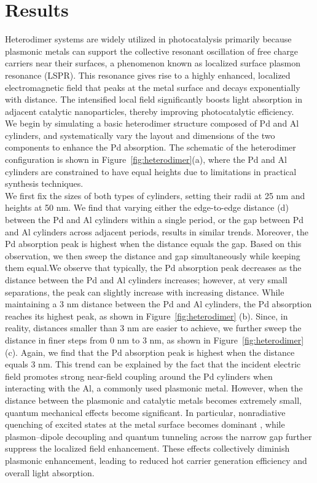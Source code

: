 \documentclass[journal]{IEEEtran}
\begin{document}
\section{Results}
\indent
Heterodimer systems are widely utilized in photocatalysis primarily because plasmonic metals can support the collective resonant oscillation of free charge carriers near their surfaces, a phenomenon known as localized surface plasmon resonance (LSPR). This resonance gives rise to a highly enhanced, localized electromagnetic field that peaks at the metal surface and decays exponentially with distance. The intensified local field significantly boosts light absorption in adjacent catalytic nanoparticles, thereby improving photocatalytic efficiency.\\
\indent
We begin by simulating a basic heterodimer structure composed of Pd and Al cylinders, and systematically vary the layout and dimensions of the two components to enhance the Pd absorption. The schematic of the heterodimer configuration is shown in Figure~\ref{fig:heterodimer}(a), where the Pd and Al cylinders are constrained to have equal heights due to limitations in practical synthesis techniques.\cite{doi:10.1021/acs.nanolett.6b03582}\\
\indent
We first fix the sizes of both types of cylinders, setting their radii at 25 nm and heights at 50 nm. We find that varying either the edge-to-edge distance (d) between the Pd and Al cylinders within a single period, or the gap between Pd and Al cylinders across adjacent periods, results in similar trends. Moreover, the Pd absorption peak is highest when the distance equals the gap. Based on this observation, we then sweep the distance and gap simultaneously while keeping them equal.We observe that typically, the Pd absorption peak decreases as the distance between the Pd and Al cylinders increases; however, at very small separations, the peak can slightly increase with increasing distance. While maintaining a 3 nm distance between the Pd and Al cylinders, the Pd absorption reaches its highest peak, as shown in Figure~\ref{fig:heterodimer} (b). Since, in reality, distances smaller than 3 nm are easier to achieve, we further sweep the distance in finer steps from 0 nm to 3 nm, as shown in Figure~\ref{fig:heterodimer} (c). Again, we find that the Pd absorption peak is highest when the distance equals 3 nm. This trend can be explained by the fact that the incident electric field promotes strong near-field coupling around the Pd cylinders when interacting with the Al, a commonly used plasmonic metal. However, when the distance between the plasmonic and catalytic metals becomes extremely small, quantum mechanical effects become significant. In particular, nonradiative quenching of excited states at the metal surface becomes dominant \cite{AN20192228}, while plasmon–dipole decoupling \cite{doi:10.1021/jacs.5b12704} and quantum tunneling across the narrow gap \cite{doi:10.1021/nl304078v} further suppress the localized field enhancement. These effects collectively diminish plasmonic enhancement, leading to reduced hot carrier generation efficiency and overall light absorption.\\
\end{document}
